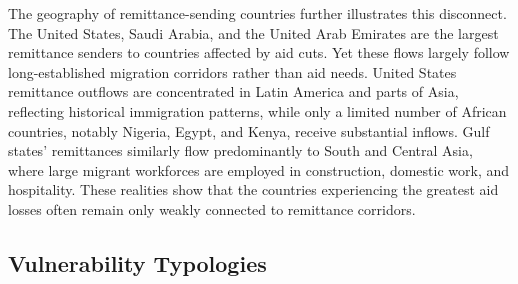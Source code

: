 \documentclass[fleqn,10pt,twocolumn]{wlscirep}
\begin{document}
{The geography of remittance-sending countries further illustrates this disconnect. The United States, Saudi Arabia, and the United Arab Emirates are the largest remittance senders to countries affected by aid cuts. Yet these flows largely follow long-established migration corridors rather than aid needs. United States remittance outflows are concentrated in Latin America and parts of Asia, reflecting historical immigration patterns, while only a limited number of African countries, notably Nigeria, Egypt, and Kenya, receive substantial inflows. Gulf states' remittances similarly flow predominantly to South and Central Asia, where large migrant workforces are employed in construction, domestic work, and hospitality. These realities show that the countries experiencing the greatest aid losses often remain only weakly connected to remittance corridors.

}

\subsection*{Vulnerability Typologies}
\end{document}
